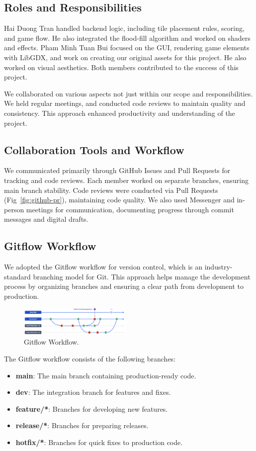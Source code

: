 \documentclass[conference]{IEEEtran}
\begin{document}
\subsection{Roles and Responsibilities}
Hai Duong Tran handled backend logic, including tile placement rules, scoring,
and game flow. He also integrated the flood-fill algorithm and worked on
shaders and effects. Pham Minh Tuan Bui focused on the GUI, rendering game
elements with LibGDX, and work on creating our original assets for this
project. He also worked on visual aesthetics. Both members contributed to the
success of this project.

We collaborated on various aspects not just within our scope and
responsibilities. We held regular meetings, and conducted code reviews to
maintain quality and consistency. This approach enhanced productivity and
understanding of the project.

\subsection{Collaboration Tools and Workflow}
We communicated primarily through GitHub Issues and Pull Requests for tracking and code reviews. Each member worked on separate branches, ensuring main branch stability. Code reviews were conducted via Pull Requests (Fig~\ref{fig:github-pr}), maintaining code quality. We also used Messenger and in-person meetings for communication, documenting progress through commit messages and digital drafts.

\subsection{Gitflow Workflow}
We adopted the Gitflow workflow\cite{atlassian:gitflow} for version control, which is an
industry-standard branching model for Git\cite{wiki:git}. This approach helps manage the
development process by organizing branches and ensuring a clear path from
development to production.

\begin{figure}[htbp]
    \centerline{\includegraphics[width=0.48\textwidth]{assets/gitflow.png}}
    \caption{Gitflow Workflow.}\label{fig:gitflow}
\end{figure}

The Gitflow workflow consists of the following branches:
\begin{itemize}
    \item \textbf{main}: The main branch containing production-ready code.
    \item \textbf{dev}: The integration branch for features and fixes.
    \item \textbf{feature/*}: Branches for developing new features.
    \item \textbf{release/*}: Branches for preparing releases.
    \item \textbf{hotfix/*}: Branches for quick fixes to production code.
\end{itemize}
\end{document}
